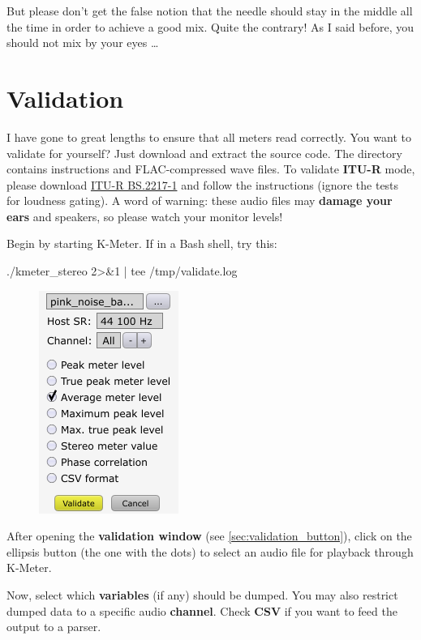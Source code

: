 But please don't get the false notion that the needle should stay in
the middle all the time in order to achieve a good mix.  Quite the
contrary!  As I said before, you should not mix by your eyes \dots

\chapter{Validation}
\label{chap:validation}

I have gone to great lengths to ensure that all meters read correctly.
You want to validate for yourself?  Just download and extract the
source code.  The directory  contains instructions
and FLAC-compressed wave files.  To validate \textbf{ITU-R} mode,
please download \href{http://www.itu.int/pub/R-REP-BS.2217}{ITU-R
  BS.2217-1} and follow the instructions (ignore the tests for
loudness gating).  A word of warning: these audio files may
\textbf{damage your ears} and speakers, so please watch your monitor
levels!

Begin by starting K-Meter.  If in a Bash shell, try this:

\begin{VerbatimBoth}
  ./kmeter_stereo 2>&1 | tee /tmp/validate.log
\end{VerbatimBoth}

\begin{figure}
\includegraphics[scale=0.45,clip]{include/images/dialog_validation.png}
\end{figure}

After opening the \textbf{validation window} (see
\ref{sec:validation_button}), click on the ellipsis button (the one
with the dots) to select an audio file for playback through K-Meter.

Now, select which \textbf{variables} (if any) should be dumped.  You
may also restrict dumped data to a specific audio \textbf{channel}.
Check \textbf{CSV} if you want to feed the output to a parser.

